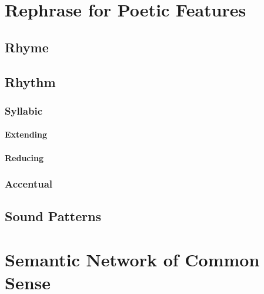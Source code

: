 


\section{Rephrase for Poetic Features}

\subsection{Rhyme}


\subsection{Rhythm}

\subsubsection{Syllabic}
\paragraph{Extending}
\paragraph{Reducing}

\subsubsection{Accentual}


\subsection{Sound Patterns}


\section{Semantic Network of Common Sense}
\label{sec:common-sense}



